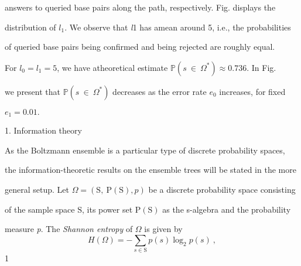 \documentclass[a4paper,12pt]{article}
\begin{document}
answers to queried base pairs along the path, respectively. Fig. displays the

distribution of $l_{1}$. We observe that {\it l}1 has amean around 5, i.e., the probabilities

of queried base pairs being confirmed and being rejected are roughly equal.

For $l_{0} = l_{1} = 5$, we have atheoretical estimate $\mathbb{P} (s\ \in\ \Omega^{*}) \approx 0.736$. In Fig.

we present that $\mathbb{P} (s\ \in\ \Omega^{*})$ decreases as the error rate $e_{0}$ increases, for fixed

$e_{1}=0.01.$

1. Information theory

As the Boltzmann ensemble is a particular type of discrete probability spaces,

the information-theoretic results on the ensemble trees will be stated in the more

general setup. Let $\Omega = (\mathrm{S},\ \mathrm{P}(\mathrm{S}),p)$ be a discrete probability space consisting

of the sample space $\mathrm{S}$, its power set $\mathrm{P}(\mathrm{S})$ as the s-algebra and the probability

measure {\it p}. The {\it Shannon entropy} of $\Omega$ is given by
$$
H(\Omega)=-\sum_{s\in \mathrm{S}}p(s)\log_{2}p(s)\ ,
$$
1
\end{document}
